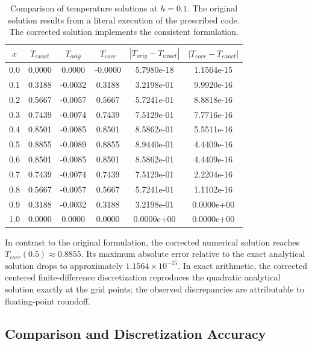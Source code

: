 \begin{table}[ht]
    \centering
    \caption{Comparison of temperature solutions at $h=0.1$. The original solution results from a literal execution of the prescribed code. The corrected solution implements the consistent formulation.}
    \label{tab:temperature-comparison}
    \begin{tabular}{cccccc}
        \toprule
        $x$ & $T_{exact}$ & $T_{orig}$ & $T_{corr}$ & $|T_{orig} - T_{exact}|$ & $|T_{corr} - T_{exact}|$ \\
        \midrule
        0.0 & 0.0000 & 0.0000 & -0.0000 & 5.7980e-18 & 1.1564e-15 \\
        0.1 & 0.3188 & -0.0032 & 0.3188 & 3.2198e-01 & 9.9920e-16 \\
        0.2 & 0.5667 & -0.0057 & 0.5667 & 5.7241e-01 & 8.8818e-16 \\
        0.3 & 0.7439 & -0.0074 & 0.7439 & 7.5129e-01 & 7.7716e-16 \\
        0.4 & 0.8501 & -0.0085 & 0.8501 & 8.5862e-01 & 5.5511e-16 \\
        0.5 & 0.8855 & -0.0089 & 0.8855 & 8.9440e-01 & 4.4409e-16 \\
        0.6 & 0.8501 & -0.0085 & 0.8501 & 8.5862e-01 & 4.4409e-16 \\
        0.7 & 0.7439 & -0.0074 & 0.7439 & 7.5129e-01 & 2.2204e-16 \\
        0.8 & 0.5667 & -0.0057 & 0.5667 & 5.7241e-01 & 1.1102e-16 \\
        0.9 & 0.3188 & -0.0032 & 0.3188 & 3.2198e-01 & 0.0000e+00 \\
        1.0 & 0.0000 & 0.0000 & 0.0000 & 0.0000e+00 & 0.0000e+00 \\
        \bottomrule
    \end{tabular}
\end{table}

In contrast to the original formulation, the corrected numerical solution reaches $T_{corr}(0.5) \approx 0.8855$. Its maximum absolute error relative to the exact analytical solution drops to approximately $1.1564 \times 10^{-15}$. In exact arithmetic, the corrected centered finite-difference discretization reproduces the quadratic analytical solution exactly at the grid points; the observed discrepancies are attributable to floating-point roundoff.

\subsection{Comparison and Discretization Accuracy}

